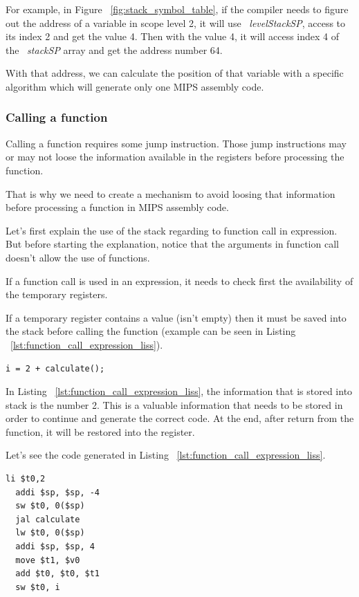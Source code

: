 \documentclass[
  oneside,
  11pt, a4paper,
  footinclude=true,
  headinclude=true,
  cleardoublepage=empty
]{scrbook}
\begin{document}
For example, in Figure ~\ref{fig:stack_symbol_table}, if the compiler needs to figure out the address of a variable in scope level 2, it will use ~\textit{levelStackSP}, access to its index 2 and get the value 4. Then with the value 4, it will access index 4 of the  ~\textit{stackSP} array and get the address number 64.

With that address, we can calculate the position of that variable with a specific algorithm which will generate only one MIPS assembly code.

\subsubsection{Calling a function}

Calling a function requires some jump instruction. Those jump instructions may or may not loose the information available in the registers before processing the function.

That is why we need to create a mechanism to avoid loosing that information before processing a function in MIPS assembly code.

Let's first explain the use of the stack regarding to function call in expression. But before starting the explanation, notice that the arguments in function call doesn't allow the use of functions.

If a function call is used in an expression, it needs to check first the availability of the temporary registers.

If a temporary register contains a value (isn't empty) then it must be saved into the stack before calling the function (example can be seen in Listing ~\ref{lst:function_call_expression_liss}).

\begin{lstlisting}[caption={Example of a function call in an expression statement},label={lst:function_call_expression_liss}]
  i = 2 + calculate();
\end{lstlisting}

In Listing ~\ref{lst:function_call_expression_liss}, the information that is stored into stack is the number 2. This is a valuable information that needs to be stored in order to continue and generate the correct code. At the end, after return from the function, it will be restored into the register.

Let's see the code generated in Listing ~\ref{lst:function_call_expression_liss}.

\begin{lstlisting}[caption={Code generated for the Listing ~\ref{lst:function_call_expression_liss}},label={lst:function_call_expression_liss}]
  li $t0,2		
  addi $sp, $sp, -4
  sw $t0, 0($sp)
  jal calculate		
  lw $t0, 0($sp)
  addi $sp, $sp, 4
  move $t1, $v0		
  add $t0, $t0, $t1	
  sw $t0, i
\end{lstlisting}
\end{document}
